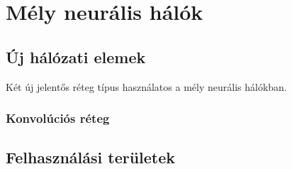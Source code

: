 \section{Mély neurális hálók}

\subsection{Új hálózati elemek}

Két új jelentős réteg típus  használatos a mély neurális hálókban.
\subsubsection{Konvolúciós réteg}



\subsection{Felhasználási területek}
